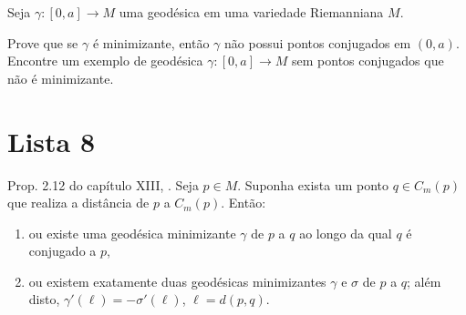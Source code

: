 \begin{exercise}
\label{exercise-minimizing-implies-no-conjugate-points}
Seja $\gamma:[0,a]\to M$ uma geodésica em uma variedade Riemanniana $M$.

 Prove que se $\gamma$ é minimizante, então $\gamma$ não possui pontos
 conjugados em  $(0,a)$. Encontre um exemplo de geodésica $\gamma:[0,a] \to M$ 
sem pontos conjugados que não é minimizante.
\end{exercise}

\section{Lista 8}
\label{section-lista-8}

\begin{exercise}
\label{exercise-l8-1}
Prop. 2.12 do capítulo XIII, \cite{doc}. Seja $p \in M$. 
Suponha exista um ponto $q \in C_m(p)$ que realiza a distância de $p$ a 
$C_m(p)$. Então:
\begin{enumerate}
\item ou existe uma geodésica 
minimizante $\gamma$ de $p$ a $q$ ao longo da qual $q$ é 
conjugado a $p$,
\item ou existem exatamente duas geodésicas 
minimizantes $\gamma$ e $\sigma$ de $p$ a $q$; além disto,
$\gamma'(\ell)=-\sigma'(\ell)$, 
$\ell=d(p,q)$. 
\end{enumerate}
\end{exercise}

